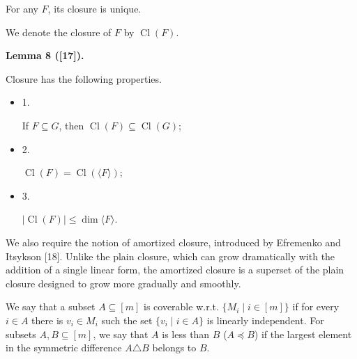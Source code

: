 \documentclass[10pt,a4paper]{article}
\begin{document}
For any $F$, its closure is unique.\par




We denote the closure of $F$ by $\operatorname{Cl}(F)$.\par



\par\medskip\noindent\textbf{
Lemma 8 ([17]).
}\par



Closure has the following properties.\par


\begin{itemize}


\item 
1. 


If $F\subseteq G$, then $\operatorname{Cl}(F)\subseteq\operatorname{Cl}(G)$;\par





\item 
2. 


$\operatorname{Cl}(F)=\operatorname{Cl}(\langle F\rangle)$;\par





\item 
3. 


$|\operatorname{Cl}(F)|\leq\dim\langle F\rangle$.\par





\end{itemize}




We also require the notion of amortized closure, introduced by Efremenko and Itsykson [18].
Unlike the plain closure, which can grow dramatically with the addition of a single linear form,
the amortized closure is a superset of the plain closure designed to grow more gradually and smoothly.\par



We say that a subset $A\subseteq[m]$ is coverable w.r.t. $\{M_{i}\mid i\in[m]\}$
if for every $i\in A$ there is $v_{i}\in M_{i}$ such the set $\{v_{i}\mid i\in A\}$ is linearly independent.
For subsets $A,B\subseteq[m]$, we say that $A$ is less than $B$ ($A\preceq B$)
if the largest element in the symmetric difference $A\triangle B$ belongs to $B$.\par
\end{document}
